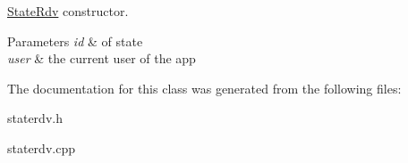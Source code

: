 \mbox{\hyperlink{class_state_rdv}{State\+Rdv}} constructor. 


\begin{DoxyParams}{Parameters}
{\em id} & of state \\
\hline
{\em user} & the current user of the app \\
\hline
\end{DoxyParams}


The documentation for this class was generated from the following files\+:\begin{DoxyCompactItemize}
\item 
staterdv.\+h\item 
staterdv.\+cpp\end{DoxyCompactItemize}
